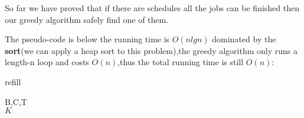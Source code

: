 \documentclass[oneside]{homework} %
\begin{document}
So far we have proved that if there are schedules all the jobs can be finished then our greedy algorithm safely find one of them.

The pseudo-code is below the running time is $O(nlgn) $ dominated by the \textbf{sort}(we can apply a heap sort to this problem),the greedy algorithm only runs a length-n loop and costs $O(n)$,thus the total running time is still $O(n)$:
\begin{algorithm}[h]
  \caption{refill}
  \label{algo:refill}
  \begin{algorithmic}[1]
	\REQUIRE B,C,T
	\ENSURE ~ ~\\ 
		\ELSE 
		\ENDIF
	\ENDWHILE
	\LASTCON $K$
  \end{algorithmic}
\end{algorithm} 
\end{document}
